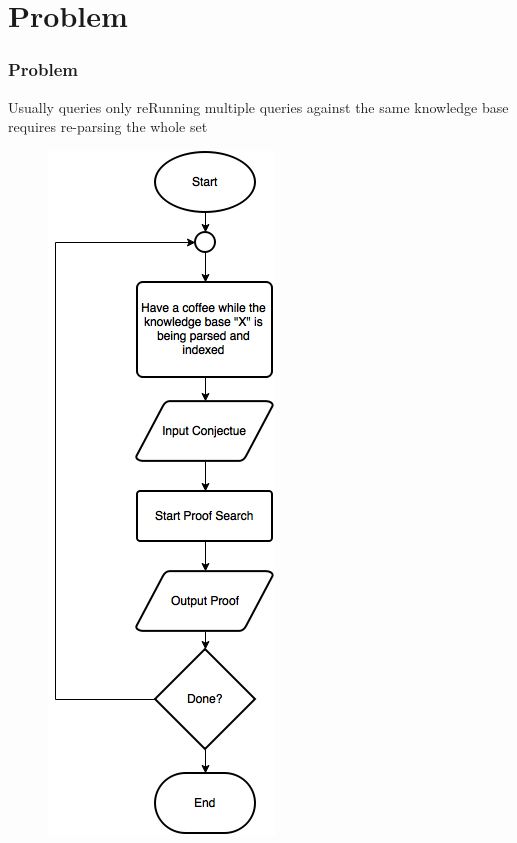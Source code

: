 \documentclass[10pt]{beamer}
\begin{document}
\section{Problem}
\begin{frame}[fragile]
  \frametitle{Problem}
  Usually queries only reRunning multiple queries against the same knowledge base requires re-parsing the whole set
\begin{figure} \includegraphics[width=\linewidth,height=0.8\textheight,keepaspectratio]{imgs/OldDeductionFC.png} \end{figure}
\end{frame}
\end{document}
